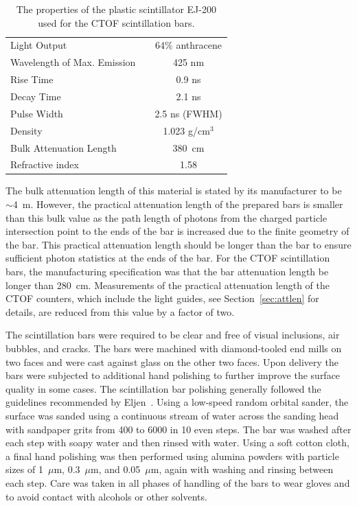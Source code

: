 \documentclass{elsart}
\begin{document}
\begin{table}[htbp]
\begin{center}
\begin{tabular}{lc} \hline
Light Output                  & 64\% anthracene \\
Wavelength of Max. Emission~~ & 425 nm \\
Rise Time                     & 0.9 ns \\
Decay Time                    & 2.1 ns \\
Pulse Width                   & 2.5 ns (FWHM) \\
Density                       & 1.023 g/cm$^3$ \\
Bulk Attenuation Length       & 380~cm \\
Refractive index              & 1.58 \\ \hline 
\end{tabular}
\end{center}
\caption{The properties of the plastic scintillator EJ-200 used for the CTOF scintillation bars.}
\label{ej200-specs}
\end{table}

The bulk attenuation length of this material is stated by its manufacturer to be $\sim$4~m. However,
the practical attenuation length of the prepared bars is smaller than this bulk value as the path length
of photons from the charged particle intersection point to the ends of the bar is increased due to the
finite geometry of the bar. This practical attenuation length should be longer than the bar to ensure
sufficient photon statistics at the ends of the bar. For the CTOF scintillation bars, the manufacturing
specification was that the bar attenuation length be longer than 280~cm. Measurements of the practical
attenuation length of the CTOF counters, which include the light guides, see Section~\ref{sec:attlen}
for details, are reduced from this value by a factor of two.

The scintillation bars were required to be clear and free of visual inclusions, air bubbles, and cracks.
The bars were machined with diamond-tooled end mills on two faces and were cast against glass on
the other two faces. Upon delivery the bars were subjected to additional hand polishing to further
improve the surface quality in some cases. The scintillation bar polishing generally followed the
guidelines recommended by Eljen~\cite{eljen-guide}. Using a low-speed random orbital sander, the
surface was sanded using a continuous stream of water across the sanding head with sandpaper grits
from 400 to 6000 in 10 even steps. The bar was washed after each step with soapy water and then
rinsed with water. Using a soft cotton cloth, a final hand polishing was then performed using alumina
powders with particle sizes of 1~$\mu$m, 0.3~$\mu$m, and 0.05~$\mu$m, again with washing and
rinsing between each step. Care was taken in all phases of handling of the bars to wear gloves and to
avoid contact with alcohols or other solvents.
\end{document}
